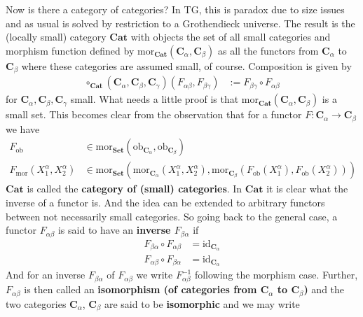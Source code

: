 Now is there a category of categories? In TG, this is paradox due to size issues and as usual is solved by restriction to a Grothendieck universe. The result is the (locally small) category $\mathbf{Cat}$ with objects the set of all small categories and morphism function defined by $\mathrm{mor}_{\mathbf{Cat}}(\mathbf{C}_{\alpha},\mathbf{C}_{\beta})$ as all the functors from $\mathbf{C}_{\alpha}$ to $\mathbf{C}_{\beta}$ where these categories are assumed small, of course. Composition is given by
\begin{align*}
  \circ_{\mathbf{Cat}}
  (\mathbf{C}_{\alpha},\mathbf{C}_{\beta},\mathbf{C}_{\gamma})
  (F_{\alpha\beta},F_{\beta\gamma})
  &:=
  F_{\beta\gamma}
  \circ
  F_{\alpha\beta}
\end{align*}
for $\mathbf{C}_{\alpha},\mathbf{C}_{\beta},\mathbf{C}_{\gamma}$ small. What needs a little proof is that $\mathrm{mor}_{\mathbf{Cat}}(\mathbf{C}_{\alpha},\mathbf{C}_{\beta})$ is a small set. This becomes clear from the observation that for a functor $F \colon \mathbf{C}_{\alpha} \rightarrow \mathbf{C}_{\beta}$ we have
\begin{align*}
  F_{\mathrm{ob}}
  &\in
  \mathrm{mor}_{\mathbf{Set}}
  (\mathrm{ob}_{\mathbf{C}_{\alpha}},\mathrm{ob}_{\mathbf{C}_{\beta}})
  \\
  F_{\mathrm{mor}}(X_{1}^{\alpha},X_{2}^{\alpha})
  &\in
  \mathrm{mor}_{\mathbf{Set}}
  \left(
    \mathrm{mor}_{\mathbf{C}_{\alpha}}(X_{1}^{\alpha},X_{2}^{\alpha}),
    \mathrm{mor}_{\mathbf{C}_{\beta}}
    (F_{\mathrm{ob}}(X_{1}^{\alpha}),F_{\mathrm{ob}}(X_{2}^{\alpha}))
  \right)
\end{align*}
$\mathbf{Cat}$ is called the \textbf{category of (small) categories}. In $\mathbf{Cat}$ it is clear what the inverse of a functor is. And the idea can be extended to arbitrary functors between not necessarily small categories. So going back to the general case, a functor $F_{\alpha\beta}$ is said to have an \textbf{inverse $F_{\beta\alpha}$} if
\begin{align*}
  F_{\beta\alpha}
  \circ
  F_{\alpha\beta}
  &=
  \mathrm{id}_{\mathbf{C}_{\alpha}}
  \\
  F_{\alpha\beta}
  \circ
  F_{\beta\alpha}
  &=
  \mathrm{id}_{\mathbf{C}_{\alpha}}
\end{align*}
And for an inverse $F_{\beta\alpha}$ of $F_{\alpha\beta}$ we write $F_{\alpha\beta}^{-1}$ following the morphism case. Further, $F_{\alpha\beta}$ is then called an \textbf{isomorphism (of categories from $\mathbf{C}_{\alpha}$ to $\mathbf{C}_{\beta}$)} and the two categories $\mathbf{C}_{\alpha}$, $\mathbf{C}_{\beta}$ are said to be \textbf{isomorphic} and we may write
